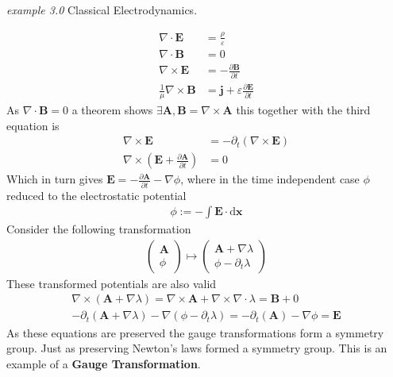\documentclass[twocolumn,floatfix,aps,prd,amsmath,amssymb]{revtex4}
\begin{document}
\begin{flushleft}\textit{example 3.0} Classical Electrodynamics. \end{flushleft}
\begin{align*}
\nabla \cdot \mathbf{E} &= \frac{\rho}{\varepsilon} \\
\nabla \cdot \mathbf{B} &= 0 \\
\nabla \times \mathbf{E} &= -\frac{\partial \mathbf{B}}{\partial t} \\
\frac{1}{\mu}\nabla \times \mathbf{B} &= \mathbf{j}+\varepsilon\frac{\partial \mathbf{E}}{\partial t}
\end{align*}
As $\nabla \cdot \mathbf{B} = 0$ a theorem shows $\exists \mathbf{A}, \mathbf{B}=\nabla \times \mathbf{A}$ this together with the third equation is
\begin{align*}
\nabla \times \mathbf{E} &= - \partial_t (\nabla \times \mathbf{E}) \\
\nabla \times (\mathbf{E}+\frac{\partial \mathbf{A}}{\partial t}) &=0
\end{align*}
Which in turn gives $\mathbf{E} = -\frac{\partial \mathbf{A}}{\partial t} - \nabla \phi$, where in the time independent case $\phi$ reduced to the electrostatic potential
\begin{align*}
\phi := -\int \mathbf{E} \cdot \mathrm{d}\mathbf{x}
\end{align*}
Consider the following transformation
\begin{align*}
\left( \begin{array}{l}
\mathbf{A} \\ \phi
\end{array} \right) \mapsto
\left( \begin{array}{l}
\mathbf{A}+\nabla \lambda \\
\phi - \partial_t \lambda
\end{array} \right)
\end{align*}
These transformed potentials are also valid
\begin{align*}
\nabla \times (\mathbf{A}+\nabla \lambda) = \nabla\times \mathbf{A} + \nabla \times \nabla \cdot \lambda  = \mathbf{B} + 0 \\
-\partial_t(\mathbf{A}+\nabla \lambda)-\nabla (\phi - \partial_t \lambda) = -\partial_t(\mathbf{A})-\nabla \phi = \mathbf{E}
\end{align*}
As these equations are preserved the gauge transformations form a symmetry group. Just as preserving Newton's laws formed a symmetry group. This is an example of a \textbf{Gauge Transformation}.
\end{document}
